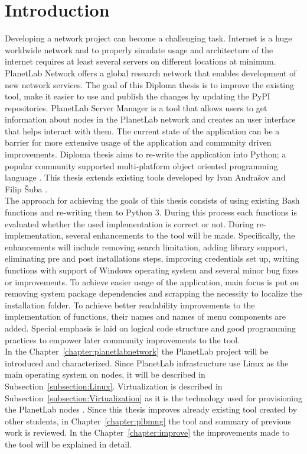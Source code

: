 \chapter*{Introduction}
{}

Developing a network project can become a challenging task. Internet is a huge worldwide network and to properly simulate usage and architecture of the internet requires at least several servers on different locations at minimum. PlanetLab Network offers a global research network that enables development of new network services. The goal of this Diploma thesis is to improve the existing tool, make it easier to use and publish the changes by updating the PyPI repositories. PlanetLab Server Manager is a tool that allows users to get information about nodes in the PlanetLab network and creates an user interface that helps interact with them. The current state of the application can be a barrier for more extensive usage of the application and community driven improvements. Diploma thesis aims to re-write the application into Python; a popular community supported multi-platform object oriented programming language \cite{lutz2013learning}. This thesis extends existing tools developed by Ivan Andrašov \cite{andrasov2} and Filip Šuba \cite{suba1}.\\
The approach for achieving the goals of this thesis consists of using existing Bash functions and re-writing them to Python 3. During this process each functions is evaluated whether the used implementation is correct or not. During re-implementation, several enhancements to the tool will be made. Specifically, the enhancements will include removing search limitation, adding library support, eliminating pre and post installations steps, improving credentials set up, writing functions with support of Windows operating system and several minor bug fixes or improvements. To achieve easier usage of the application, main focus is put on removing system package dependencies and scrapping the necessity to localize the installation folder. To achieve better readability improvements to the implementation of functions, their names and names of menu components are added. Special emphasis is laid on logical code structure and good programming practices to empower later community improvements to the tool.\\
In the Chapter~\ref{chapter:planetlabnetwork} the PlanetLab project will be introduced and characterized. Since PlanetLab infrastructure use Linux as the main operating system on nodes, it will be described in Subsection~\ref{subsection:Linux}. Virtualization is described in Subsection~\ref{subsection:Virtualization} as it is the technology used for provisioning the PlanetLab nodes \cite{planetlababout}. Since this thesis improves already existing tool created by other students, in Chapter~\ref{chapter:plbmng} the tool and summary of previous work is reviewed. In the Chapter~\ref{chapter:improve} the improvements made to the tool will be explained in detail.